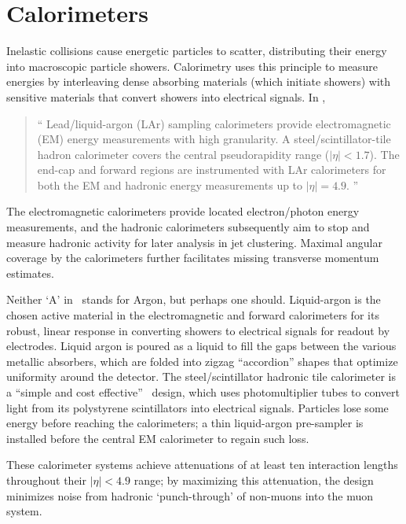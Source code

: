 \section{Calorimeters}
\label{sec:atlas_calo}
Inelastic collisions cause energetic particles to scatter, distributing their
energy into macroscopic particle showers.
Calorimetry uses this principle to measure energies
by interleaving dense absorbing materials (which initiate showers)
with sensitive materials that convert showers into electrical signals.
In \atlas,
\begin{quote}
``%
Lead/liquid-argon (LAr) sampling calorimeters provide electromagnetic (EM)
energy measurements with high granularity.
A steel/scintillator-tile hadron calorimeter covers the central pseudorapidity
range ($|\eta| < 1.7$).
The end-cap and forward regions are instrumented with LAr calorimeters for both
the EM and hadronic energy measurements up to $|\eta| = 4.9$.%
''~\cite{atlas2022searches}
\end{quote}
The electromagnetic calorimeters provide located electron/photon energy
measurements,
and the hadronic calorimeters subsequently aim to stop and measure hadronic
activity for later analysis in jet clustering.
Maximal angular coverage by the calorimeters further facilitates missing
transverse momentum estimates.

Neither `A' in \atlas\ stands for Argon, but perhaps one should.
Liquid-argon is the chosen active material in the electromagnetic and forward
calorimeters for its robust, linear response in converting showers to
electrical signals for readout by electrodes.
Liquid argon is poured as a liquid to fill the gaps between the various
metallic absorbers, which are folded into zigzag ``accordion'' shapes that
optimize uniformity around the detector.
The steel/scintillator hadronic tile calorimeter is a
``simple and cost effective''~\cite{atlas1996tile} design, which uses
photomultiplier tubes to convert light from its polystyrene scintillators into
electrical signals.
Particles lose some energy before reaching the calorimeters; a thin
liquid-argon pre-sampler is installed before the central EM calorimeter
to regain such loss.

These calorimeter systems achieve attenuations of at least ten interaction
lengths throughout their $|\eta| < 4.9$ range;
by maximizing this attenuation, the design minimizes noise from hadronic
`punch-through' of non-muons into the muon system.


